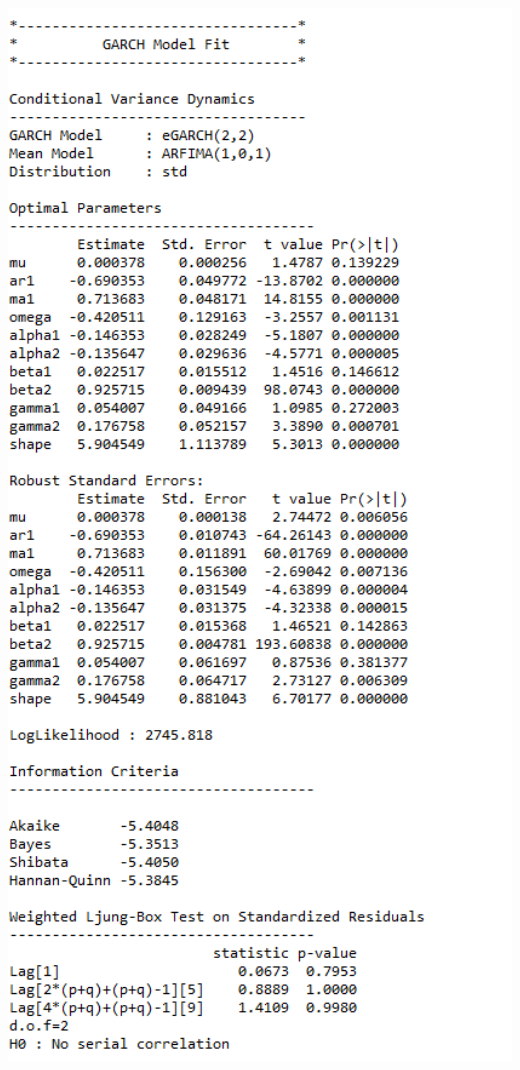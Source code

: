 \documentclass[
  12pt,
  a4paper,
  openany]{book}
\begin{document}
\begin{center}
\begin{minipage}{0.90\linewidth}
    \centering
    \includegraphics[width=2\textwidth]{image/air1.png}
\end{minipage}
\end{center}
\end{document}
